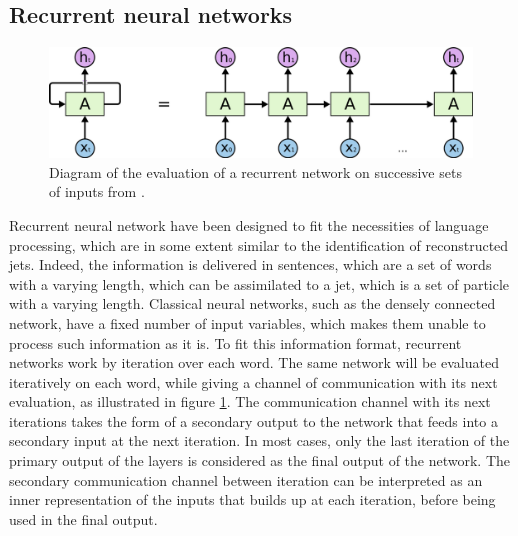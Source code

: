 

\subsection{Recurrent neural networks}

\begin{figure}
    \centering
    \includegraphics[width=\textwidth]{Images/recurrent_network.png}
    \caption{Diagram of the evaluation of a recurrent network on successive sets of inputs from \cite{RNN}.}
    \label{fig:recurrent_network}
\end{figure}

Recurrent neural network have been designed to fit the necessities of language processing, which are in some extent similar to the \tauh identification of reconstructed jets. Indeed, the information is delivered in sentences, which are a set of words with a varying length, which can be assimilated to a jet, which is a set of particle with a varying length. Classical neural networks, such as the densely connected network, have a fixed number of input variables, which makes them unable to process such information as it is. To fit this information format, recurrent networks work by iteration over each word. The same network will be evaluated iteratively on each word, while giving a channel of communication with its next evaluation, as illustrated in figure \ref{fig:recurrent_network}. The communication channel with its next iterations takes the form of a secondary output to the network that feeds into a secondary input at the next iteration. In most cases, only the last iteration of the primary output of the layers is considered as the final output of the network. The secondary communication channel between iteration can be interpreted as an inner representation of the inputs that builds up at each iteration, before being used in the final output.

